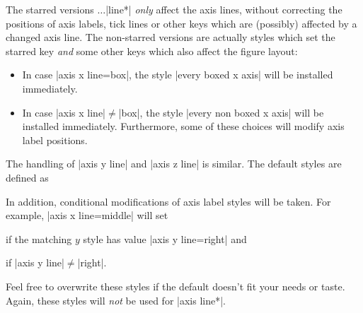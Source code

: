 \begin{pgfplotskeylist}
    The starred versions $\dotsc$|line*| \emph{only} affect the axis lines,
    without correcting the positions of axis labels, tick lines or other keys
    which are (possibly) affected by a changed axis line. The non-starred
    versions are actually styles which set the starred key \emph{and} some
    other keys which also affect the figure layout:
    \begin{itemize}
        \item In case |axis x line=box|, the style |every boxed x axis| will
            be installed immediately.
        \item In case |axis x line|$\neq$|box|, the style
            |every non boxed x axis| will be installed immediately.
            Furthermore, some of these choices will modify axis label
            positions.
    \end{itemize}
    The handling of |axis y line| and |axis z line| is similar. The default
    styles are defined as
\begin{codeexample}
\end{codeexample}
    In addition, conditional modifications of axis label styles will be taken.
    For example, |axis x line=middle| will set
\begin{codeexample}
\end{codeexample}
    if the matching $y$ style has value |axis y line=right| and
\begin{codeexample}
\end{codeexample}
    if |axis y line|$\neq$|right|.

    Feel free to overwrite these styles if the default doesn't fit your needs
    or taste. Again, these styles will \emph{not} be used for |axis line*|.

\begin{codeexample}[]
\end{codeexample}


\end{pgfplotskeylist}

